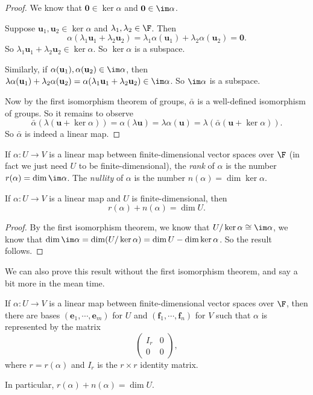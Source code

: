 \documentclass[a4paper]{article}
\begin{document}
\begin{proof}
  We know that $\mathbf{0} \in \ker \alpha$ and $\mathbf{0}\in \im \alpha$.

  Suppose $\mathbf{u}_1, \mathbf{u}_2 \in \ker \alpha$ and $\lambda_1, \lambda_2\in \F$. Then
  \[
    \alpha (\lambda_1 \mathbf{u}_1 + \lambda_2 \mathbf{u}_2) = \lambda_1 \alpha(\mathbf{u}_1) + \lambda_2 \alpha(\mathbf{u}_2) = \mathbf{0}.
  \]
  So $\lambda_1 \mathbf{u}_1 + \lambda_2 \mathbf{u}_2 \in \ker \alpha$. So $\ker \alpha$ is a subspace.

  Similarly, if $\alpha(\mathbf{u}_1), \alpha(\mathbf{u}_2) \in \im \alpha$, then $\lambda\alpha(\mathbf{u}_1) + \lambda_2 \alpha(\mathbf{u}_2) = \alpha(\lambda_1 \mathbf{u}_1 + \lambda_2 \mathbf{u}_2) \in \im \alpha$. So $\im \alpha$ is a subspace.

  Now by the first isomorphism theorem of groups, $\bar{\alpha}$ is a well-defined isomorphism of groups. So it remains to observe
  \[
    \bar{\alpha}(\lambda(\mathbf{u} + \ker \alpha)) = \alpha (\lambda \mathbf{u}) = \lambda \alpha(\mathbf{u}) = \lambda (\bar{\alpha}(\mathbf{u} + \ker \alpha)).
  \]
  So $\bar {\alpha}$ is indeed a linear map.
\end{proof}

\begin{defi}
  If $\alpha: U\to V$ is a linear map between finite-dimensional vector spaces over $\F$ (in fact we just need $U$ to be finite-dimensional), the \emph{rank} of $\alpha$ is the number $r(\alpha) = \dim \im \alpha$. The \emph{nullity} of $\alpha$ is the number $n(\alpha) = \dim \ker \alpha$.
\end{defi}

\begin{cor}
  If $\alpha: U \to V$ is a linear map and $U$ is finite-dimensional, then
  \[
    r(\alpha) + n(\alpha) = \dim U.
  \]
\end{cor}

\begin{proof}
  By the first isomorphism theorem, we know that $U/\ker \alpha \cong \im \alpha$, we know that $\dim \im \alpha = \dim (U/\ker \alpha) = \dim U - \dim \ker \alpha$. So the result follows.
\end{proof}

We can also prove this result without the first isomorphism theorem, and say a bit more in the mean time.
\begin{prop}
  If $\alpha: U\to V$ is a linear map between finite-dimensional vector spaces over $\F$, then there are bases $(\mathbf{e}_1, \cdots, \mathbf{e}_m)$ for $U$ and $(\mathbf{f}_1, \cdots, \mathbf{f}_n)$ for $V$ such that $\alpha$ is represented by the matrix
  \[
    \begin{pmatrix}
      I_r & 0\\
      0 & 0
    \end{pmatrix},
  \]
  where $r = r(\alpha)$ and $I_r$ is the $r\times r$ identity matrix.

  In particular, $r(\alpha) + n(\alpha) = \dim U$.
\end{prop}
\end{document}
